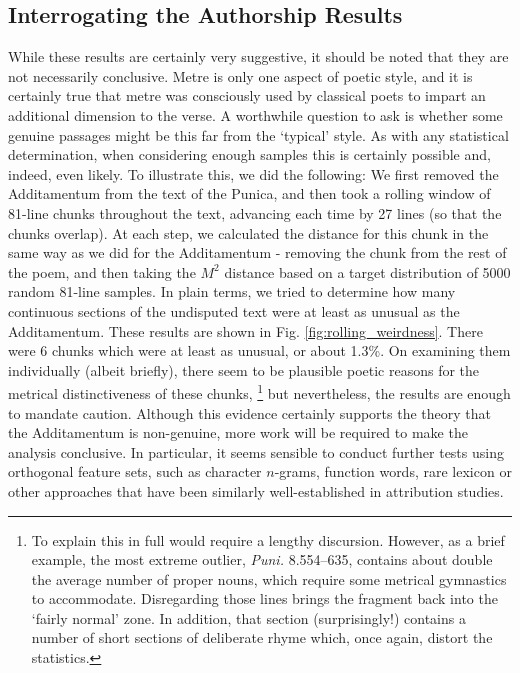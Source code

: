 \documentclass[11pt,a4paper]{scrartcl} %
\begin{document}
{\subsection{Interrogating the Authorship Results}

While these results are certainly very suggestive, it should be noted that they are not necessarily conclusive. Metre is only one aspect of poetic style, and it is certainly true that metre was consciously used by classical poets to impart an additional dimension to the verse. A worthwhile question to ask is whether some genuine passages might be this far from the `typical' style. As with any statistical determination, when considering enough samples this is certainly possible and, indeed, even likely. To illustrate this, we did the following: We first removed the Additamentum from the text of the Punica, and then took a rolling window of 81-line chunks throughout the text, advancing each time by 27 lines (so that the chunks overlap). At each step, we calculated the distance for this chunk in the same way as we did for the Additamentum - removing the chunk from the rest of the poem, and then taking the $M^{2}$ distance based on a target distribution of 5000 random 81-line samples. In plain terms, we tried to determine how many continuous sections of the undisputed text were at least as unusual as the Additamentum. These results are shown in Fig. \ref{fig:rolling_weirdness}. There were 6 chunks which were at least as unusual, or about 1.3\%. On examining them individually (albeit briefly), there seem to be plausible poetic reasons for the metrical distinctiveness of these chunks,%
\footnote{To explain this in full would require a lengthy discursion. However, as a brief example, the most extreme outlier, \textit{Puni.} 8.554--635, contains about double the average number of proper nouns, which require some metrical gymnastics to accommodate. Disregarding those lines brings the fragment back into the `fairly normal' zone. In addition, that section (surprisingly!) contains a number of short sections of deliberate rhyme which, once again, distort the statistics.}
but nevertheless, the results are enough to mandate caution. Although this evidence certainly supports the theory that the Additamentum is non-genuine, more work will be required to make the analysis conclusive. In particular, it seems sensible to conduct further tests using orthogonal feature sets, such as character $n$-grams, function words, rare lexicon or other approaches that have been similarly well-established in attribution studies.

}
\end{document}
